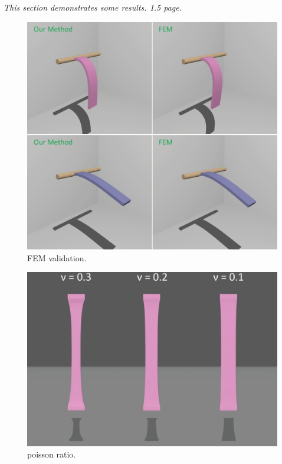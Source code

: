 \emph{This section demonstrates some results. 1.5 page.}
\begin{figure}[h]
  \centering
  \includegraphics[width=\linewidth]{./figs/demo_strip_vs_fem.eps}
  \caption{\label{fig:8}
  FEM validation.
}
\end{figure}
\begin{figure}[h]
  \centering
  \includegraphics[width=\linewidth]{./figs/compare_different_poisson_ratio.eps}
  \caption{\label{fig:9}
  poisson ratio.
}
\end{figure}
